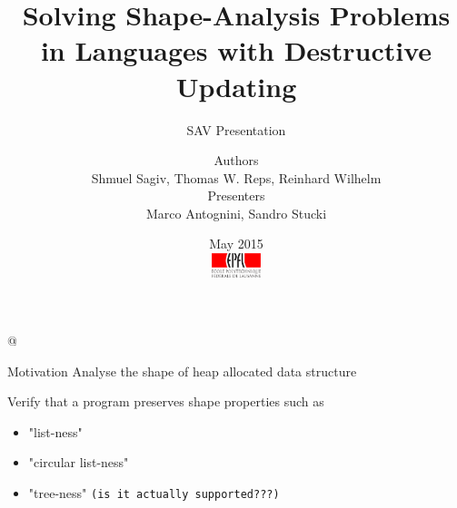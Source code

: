 \documentclass[xcolor={usenames,dvipsnames}]{beamer}
\title{Solving Shape-Analysis Problems in Languages with Destructive Updating}
\subtitle{SAV Presentation}
\author[Sagiv~et~al.]{%
  {\small Authors}\\ \vspace{1ex}
  Shmuel Sagiv, Thomas W. Reps, Reinhard Wilhelm \\
  \vspace{1em}
  {\small Presenters}\\ \vspace{1ex}
  Marco Antognini, Sandro Stucki
}
\date{%
  \vspace{-1em}
  \small May 2015\\[2em]
  \includegraphics[height=7mm]{img/epfl-logo}}
\newcommand{\TODO}[1]{\texttt{\textcolor{YellowOrange}{(#1)}}}
\begin{document}
\begin{frame}
  \titlepage
\end{frame}

\lstMakeShortInline[%
  style=scala-color,%
  flexiblecolumns=false,%
  mathescape=false,%
  basicstyle=\color{blue!30!darkgray}\tt]@




\begin{frame}[fragile]{Motivation}
  Analyse the shape of heap allocated data structure

  \vspace{1em}
  
  Verify that a program preserves shape properties such as
  \begin{itemize}
  \item "list-ness"
  \item "circular list-ness"
  \item "tree-ness" \TODO{is it actually supported???}
  \end{itemize}
\end{frame}
\end{document}
